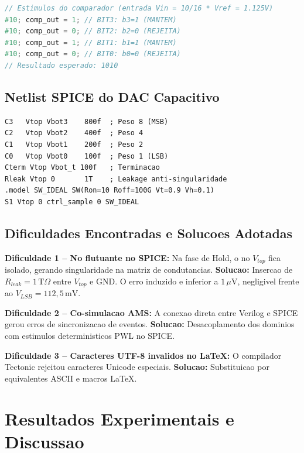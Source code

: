 \documentclass[12pt, a4paper]{article}
\begin{document}
\begin{lstlisting}[language=Verilog, caption={Estimulos do Testbench para resultado esperado $1010_2$.}]
// Estimulos do comparador (entrada Vin = 10/16 * Vref = 1.125V)
#10; comp_out = 1; // BIT3: b3=1 (MANTEM)
#10; comp_out = 0; // BIT2: b2=0 (REJEITA)
#10; comp_out = 1; // BIT1: b1=1 (MANTEM)
#10; comp_out = 0; // BIT0: b0=0 (REJEITA)
// Resultado esperado: 1010
\end{lstlisting}

\subsection{Netlist SPICE do DAC Capacitivo}

\begin{lstlisting}[caption={Extrato de \texttt{dac\_4bit.cir} -- banco de capacitores e chave S\&H.}]
C3   Vtop Vbot3    800f  ; Peso 8 (MSB)
C2   Vtop Vbot2    400f  ; Peso 4
C1   Vtop Vbot1    200f  ; Peso 2
C0   Vtop Vbot0    100f  ; Peso 1 (LSB)
Cterm Vtop Vbot_t 100f   ; Terminacao
Rleak Vtop 0       1T    ; Leakage anti-singularidade
.model SW_IDEAL SW(Ron=10 Roff=100G Vt=0.9 Vh=0.1)
S1 Vtop 0 ctrl_sample 0 SW_IDEAL
\end{lstlisting}

\subsection{Dificuldades Encontradas e Solucoes Adotadas}

\textbf{Dificuldade 1 -- No flutuante no SPICE:}
Na fase de Hold, o no $V_{top}$ fica isolado, gerando singularidade na matriz de condutancias.
\textbf{Solucao:} Insercao de $R_{leak} = 1\,\text{T}\Omega$ entre $V_{top}$ e GND.
O erro induzido e inferior a $1\,\mu\text{V}$, negligivel frente ao $V_{LSB} = 112{,}5\,\text{mV}$.

\textbf{Dificuldade 2 -- Co-simulacao AMS:}
A conexao direta entre Verilog e SPICE gerou erros de sincronizacao de eventos.
\textbf{Solucao:} Desacoplamento dos dominios com estimulos deterministicos PWL no SPICE.

\textbf{Dificuldade 3 -- Caracteres UTF-8 invalidos no LaTeX:}
O compilador Tectonic rejeitou caracteres Unicode especiais.
\textbf{Solucao:} Substituicao por equivalentes ASCII e macros LaTeX.

\section{Resultados Experimentais e Discussao}
\end{document}
